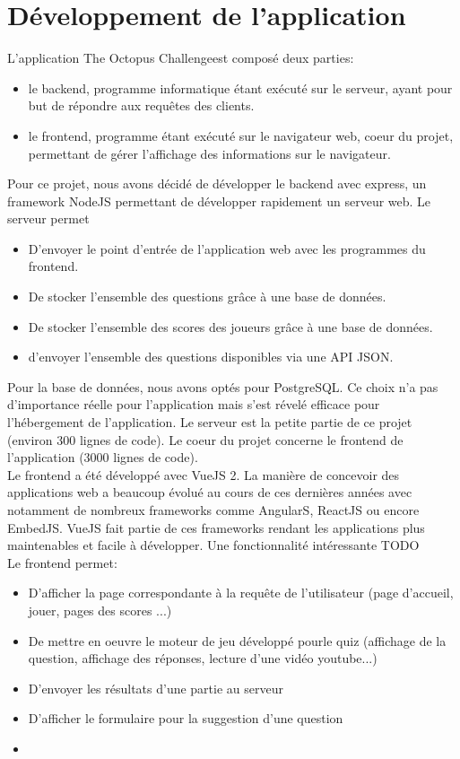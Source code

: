 \documentclass[a4paper,11pt, oneside]{book}
\def\appName{The Octopus Challenge}
\begin{document}
\section{Développement de l'application}


L'application \appName est composé deux parties:
\begin{itemize}
	\item le backend, programme informatique étant exécuté sur le serveur, ayant pour but de répondre aux requêtes des clients.
	\item le frontend, programme étant exécuté sur le navigateur web, coeur du projet, permettant de gérer l'affichage des informations sur le navigateur.\\
\end{itemize}

\noindent Pour ce projet, nous avons décidé de développer le backend avec express, un framework NodeJS permettant de développer rapidement un serveur web. Le serveur permet
\begin{itemize}
	\item D'envoyer le point d'entrée de l'application web avec les programmes du frontend.
	\item De stocker l'ensemble des questions grâce à une base de données.
	\item De stocker l'ensemble des scores des joueurs grâce à une base de données.
	\item d'envoyer l'ensemble des questions disponibles via une API JSON.\\
\end{itemize}

\noindent Pour la base de données, nous avons optés pour PostgreSQL. Ce choix n'a pas d'importance réelle pour l'application mais s'est révelé efficace pour l'hébergement de l'application.
Le serveur est la petite partie de ce projet (environ 300 lignes de code). Le coeur du projet concerne le frontend de l'application (3000 lignes de code).\\

Le frontend a été développé avec VueJS 2. La manière de concevoir des applications web a beaucoup évolué au cours de ces dernières années avec notamment de nombreux frameworks comme AngularS, ReactJS ou encore EmbedJS. VueJS fait partie
de ces frameworks rendant les applications plus maintenables et facile à développer. Une fonctionnalité intéressante TODO\\

\noindent Le frontend permet:
\begin{itemize}
		\item D'afficher la page correspondante à la requête de l'utilisateur (page d'accueil, jouer, pages des scores ...)
		\item De mettre en oeuvre le moteur de jeu développé pourle quiz (affichage de la question, affichage des réponses, lecture d'une vidéo youtube...)
		\item D'envoyer les résultats d'une partie au serveur
		\item D'afficher le formulaire pour la suggestion d'une question
		\item
\end{itemize}
\end{document}
